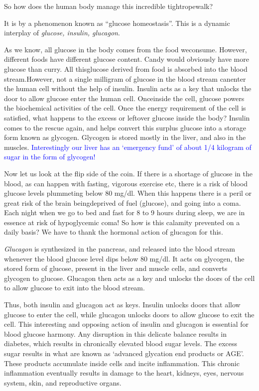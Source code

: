 \vskip 6pt
So how does the human body manage this incredible tightrope\break walk?

\vskip 6pt
It is by a phenomenon known as “glucose homeostasis”. This is a dynamic interplay of \textit{glucose, insulin, glucagon}.

\vskip 6pt
As we know, all glucose in the body comes from the food we\break consume. However, different foods have different glucose content. Candy would obviously have more glucose than curry. All this\break glucose derived from food is absorbed into the blood stream.\break However, not a single milligram of glucose in the blood stream can\break enter the human cell without the help of insulin. Insulin acts as a key that unlocks the door to allow glucose enter the human cell. Once\break inside the cell, glucose powers the biochemical activities of the cell. Once the energy requirement of the cell is satisfied, what happens to the excess or leftover glucose inside the body? Insulin comes to the rescue again, and helps convert this surplus glucose into a storage form known as glycogen. Glycogen is stored mostly in the liver, and also in the muscles. \textcolor{blue}{Interestingly our liver has an ‘emergency fund’ of about 1/4 kilogram of sugar in the form of glycogen!}

\vskip 6pt
Now let us look at the flip side of the coin. If there is a shortage of glucose in the blood, as can happen with fasting, vigorous exercise etc, there is a risk of blood glucose levels plummeting below 80 mg/dl. When this happens there is a peril or great risk of the brain being\break deprived of fuel (glucose), and going into a coma. Each night when we go to bed and fast for 8 to 9 hours during sleep, we are in essence at risk of hypoglycemic coma! So how is this calamity prevented on a daily basis? We have to thank the hormonal action of glucagon for this.

\vskip 6pt
\textit{Glucagon} is synthesized in the pancreas, and released into the blood stream whenever the blood glucose level dips below 80 mg/dl. It acts on glycogen, the stored form of glucose, present in the liver and muscle cells, and converts glycogen to glucose. Glucagon then acts as a key and unlocks the doors of the cell to allow glucose to exit into the blood stream.

\vskip 6pt
Thus, both insulin and glucagon act as keys. Insulin unlocks doors that allow glucose to enter the cell, while glucagon unlocks doors to allow glucose to exit the cell. This interesting and opposing action of insulin and glucagon is essential for blood glucose harmony. Any disruption in this delicate balance results in diabetes, which results in chronically elevated blood sugar levels. The excess sugar results in what are known as ‘advanced glycation end products or AGE’. These products accumulate inside cells and incite inflammation. This chronic inflammation eventually results in damage to the heart, kidneys, eyes, nervous system, skin, and reproductive organs.

